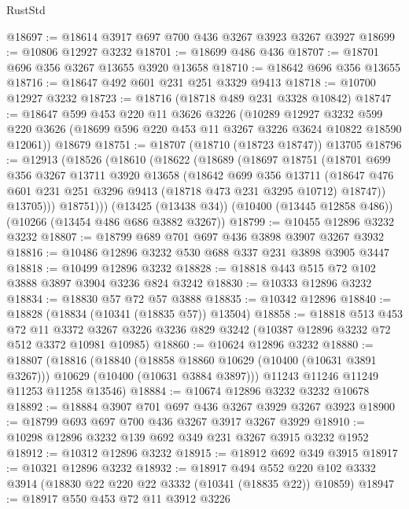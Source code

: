 \begin{lexlean}{RustStd}
\begin{coremodule}
{\begin{coremodule}
{{{{{{{{{{{{{{{{{{{{{{{{{@18697 := @18614 @3917 @697 @700 @436 @3267 @3923 @3267 @3927
@18699 := @10806 @12927 @3232
@18701 := @18699 @486 @436
@18707 := @18701 @696 @356 @3267 @13655 @3920 @13658
@18710 := @18642 @696 @356 @13655
@18716 := @18647 @492 @601 @231 @251 @3329 @9413
@18718 := @10700 @12927 @3232
@18723 := @18716 (@18718 @489 @231 @3328 @10842)
@18747 := @18647
    @599
    @453
    @220
    @11
    @3626
    @3226
    (@10289
      @12927
      @3232
      @599
      @220
      @3626
      (@18699 @596 @220 @453 @11 @3267 @3226 @3624 @10822 @18590 @12061))
    @18679
@18751 := @18707 (@18710 (@18723 @18747)) @13705
@18796 := @12913
    (@18526
      (@18610
        (@18622
          (@18689
            (@18697
              @18751
              (@18701
                @699
                @356
                @3267
                @13711
                @3920
                @13658
                (@18642
                  @699
                  @356
                  @13711
                  (@18647 @476 @601 @231 @251 @3296 @9413 (@18718 @473 @231 @3295 @10712) @18747))
                @13705)))
          @18751)))
    (@13425 (@13438 @34))
    (@10400 (@13445 @12858 @486))
    (@10266 (@13454 @486 @686 @3882 @3267))
@18799 := @10455 @12896 @3232 @3232
@18807 := @18799 @689 @701 @697 @436 @3898 @3907 @3267 @3932
@18816 := @10486 @12896 @3232 @530 @688 @337 @231 @3898 @3905 @3447
@18818 := @10499 @12896 @3232
@18828 := @18818 @443 @515 @72 @102 @3888 @3897 @3904 @3236 @824 @3242
@18830 := @10333 @12896 @3232
@18834 := @18830 @57 @72 @57 @3888
@18835 := @10342 @12896
@18840 := @18828 (@18834 (@10341 (@18835 @57)) @13504)
@18858 := @18818
    @513
    @453
    @72
    @11
    @3372
    @3267
    @3226
    @3236
    @829
    @3242
    (@10387 @12896 @3232 @72 @512 @3372 @10981 @10985)
@18860 := @10624 @12896 @3232
@18880 := @18807
    (@18816
      (@18840
        (@18858 @18860 @10629 (@10400 (@10631 @3891 @3267)))
        @10629
        (@10400 (@10631 @3884 @3897)))
      @11243
      @11246
      @11249
      @11253
      @11258
      @13546)
@18884 := @10674 @12896 @3232 @3232 @10678
@18892 := @18884 @3907 @701 @697 @436 @3267 @3929 @3267 @3923
@18900 := @18799 @693 @697 @700 @436 @3267 @3917 @3267 @3929
@18910 := @10298 @12896 @3232 @139 @692 @349 @231 @3267 @3915 @3232 @1952
@18912 := @10312 @12896 @3232
@18915 := @18912 @692 @349 @3915
@18917 := @10321 @12896 @3232
@18932 := @18917
    @494
    @552
    @220
    @102
    @3332
    @3914
    (@18830 @22 @220 @22 @3332 (@10341 (@18835 @22)) @10859)
@18947 := @18917
    @550
    @453
    @72
    @11
    @3912
    @3226
}}}}}}}}}}}}}}}}}}}}}}}}}
\end{coremodule}}
\end{coremodule}
\end{lexlean}

